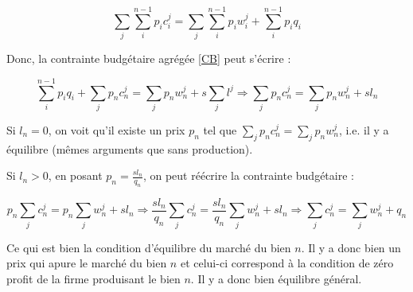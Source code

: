 \documentclass[11pt]{article}
\begin{document}
 $$ \sum_j \sum_i^{n-1} p_i c_i^j =  \sum_j \sum_i^{n-1} p_i w_i^j + \sum_i^{n-1} p_i q_i $$
 
 Donc, la contrainte budgétaire agrégée \ref{CB} peut s'écrire : 
 
  $$ \sum_i^{n-1} p_i q_i + \sum_j p_n c_n^j =  \sum_j p_n w_n^j + s \sum_j l^j \Rightarrow  \sum_j p_n c_n^j =  \sum_j p_n w_n^j + sl_n   $$
  
  Si $l_n = 0$, on voit qu'il existe un prix $p_n$ tel que $\sum_j p_n c_n^j =  \sum_j p_n w_n^j    $, i.e. il y a équilibre (mêmes arguments que sans production).

Si $l_n>0$, en posant $p_n = \frac{s l_n}{q_n}$, on peut réécrire la contrainte budgétaire :



$$ p_n \sum_j  c_n^j = p_n \sum_j w_n^j+ sl_n \Rightarrow      \frac{s l_n}{q_n} \sum_j  c_n^j = \frac{s l_n}{q_n} \sum_j w_n^j+ sl_n \Rightarrow \sum_j c_n^j = \sum_j w_n^j+ q_n  $$

Ce qui est bien la condition d'équilibre du marché du bien $n$. Il y a donc bien un prix qui apure le marché du bien $n$ et celui-ci correspond à la condition de zéro profit de la firme produisant le bien $n$. Il y a donc bien équilibre général.
\end{document}
